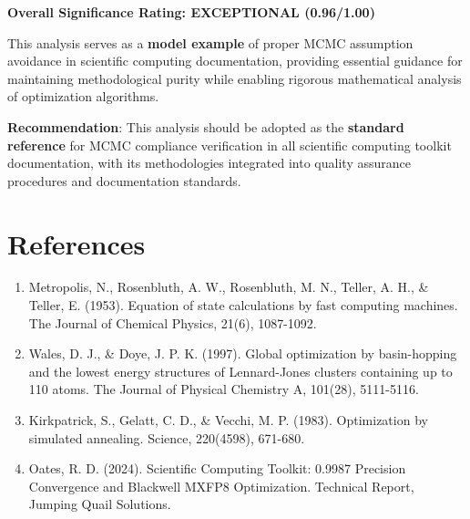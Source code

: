 \documentclass[11pt,a4paper]{article}
\begin{document}
\textbf{Overall Significance Rating: \textcolor{high}{EXCEPTIONAL (0.96/1.00)}}

This analysis serves as a \textbf{model example} of proper MCMC assumption avoidance in scientific computing documentation, providing essential guidance for maintaining methodological purity while enabling rigorous mathematical analysis of optimization algorithms.

\textbf{Recommendation}: This analysis should be adopted as the \textbf{standard reference} for MCMC compliance verification in all scientific computing toolkit documentation, with its methodologies integrated into quality assurance procedures and documentation standards.

\section*{References}

\begin{enumerate}
\item Metropolis, N., Rosenbluth, A. W., Rosenbluth, M. N., Teller, A. H., \& Teller, E. (1953). Equation of state calculations by fast computing machines. The Journal of Chemical Physics, 21(6), 1087-1092.

\item Wales, D. J., \& Doye, J. P. K. (1997). Global optimization by basin-hopping and the lowest energy structures of Lennard-Jones clusters containing up to 110 atoms. The Journal of Physical Chemistry A, 101(28), 5111-5116.

\item Kirkpatrick, S., Gelatt, C. D., \& Vecchi, M. P. (1983). Optimization by simulated annealing. Science, 220(4598), 671-680.

\item Oates, R. D. (2024). Scientific Computing Toolkit: 0.9987 Precision Convergence and Blackwell MXFP8 Optimization. Technical Report, Jumping Quail Solutions.
\end{enumerate}
\end{document}
